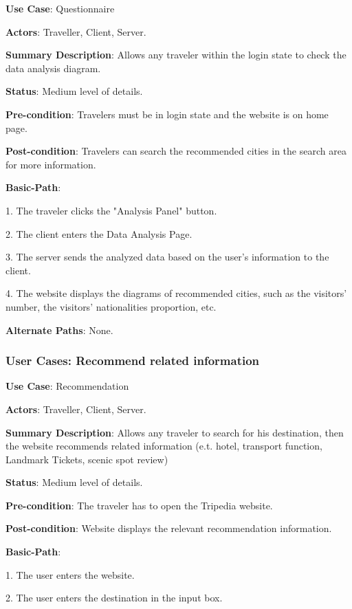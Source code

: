 \documentclass[conference]{IEEEtran}
\begin{document}
\textbf{ }

\textbf{Use Case}: Questionnaire

\textbf{Actors}: Traveller, Client, Server.

\textbf{Summary Description}: Allows any traveler within the login state to check the data analysis diagram.
 
\textbf{Status}: Medium level of details.

\textbf{Pre-condition}: Travelers must be in login state and the website is on home page.

\textbf{Post-condition}: Travelers can search the recommended cities in the search area for more information.

\textbf{Basic-Path}:


1. The traveler clicks the "Analysis Panel" button.

2. The client enters the Data Analysis Page.

3. The server sends the analyzed data based on the user's information to the client.

4. The website displays the diagrams of recommended cities, such as the visitors' number, the visitors' nationalities proportion, etc.

\textbf{Alternate Paths}: None.

\subsubsection{User Cases: Recommend related information}

\textbf{ }

\textbf{Use Case}: Recommendation

\textbf{Actors}: Traveller, Client, Server.

\textbf{Summary Description}: Allows any traveler to search for his destination, then the website recommends related information (e.t. hotel, transport function, Landmark Tickets, scenic spot review)

\textbf{Status}: Medium level of details.

\textbf{Pre-condition}: The traveler has to open the Tripedia website.

\textbf{Post-condition}: Website displays the relevant recommendation information.

\textbf{Basic-Path}:

1. The user enters the website.

2. The user enters the destination in the input box.
\end{document}
